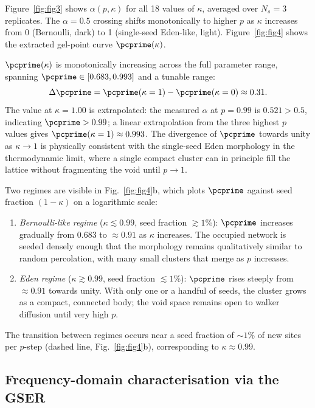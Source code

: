 Figure~\ref{fig:fig3} shows $\alpha(p, \kappa)$ for all 18 values of $\kappa$, averaged over $N_s = 3$ replicates. The $\alpha = 0.5$ crossing shifts monotonically to higher $p$ as $\kappa$ increases from 0 (Bernoulli, dark) to 1 (single-seed Eden-like, light). Figure~\ref{fig:fig4} shows the extracted gel-point curve $\pcprime(\kappa)$.

$\pcprime(\kappa)$ is monotonically increasing across the full parameter range, spanning $\pcprime \in [0.683, 0.993]$ and a tunable range:
\begin{equation}
  \Delta\pcprime = \pcprime(\kappa=1) - \pcprime(\kappa=0) \approx 0.31.
  \label{eq:range}
\end{equation}
The value at $\kappa = 1.00$ is extrapolated: the measured $\alpha$ at $p = 0.99$ is $0.521 > 0.5$, indicating $\pcprime > 0.99$; a linear extrapolation from the three highest $p$ values gives $\pcprime(\kappa=1) \approx 0.993$. The divergence of $\pcprime$ towards unity as $\kappa \to 1$ is physically consistent with the single-seed Eden morphology in the thermodynamic limit, where a single compact cluster can in principle fill the lattice without fragmenting the void until $p \to 1$.

Two regimes are visible in Fig.~\ref{fig:fig4}b, which plots $\pcprime$ against seed fraction $(1-\kappa)$ on a logarithmic scale:

\begin{enumerate}
  \item \emph{Bernoulli-like regime} ($\kappa \lesssim 0.99$, seed fraction $\gtrsim 1\%$): $\pcprime$ increases gradually from 0.683 to $\approx 0.91$ as $\kappa$ increases. The occupied network is seeded densely enough that the morphology remains qualitatively similar to random percolation, with many small clusters that merge as $p$ increases.

  \item \emph{Eden regime} ($\kappa \gtrsim 0.99$, seed fraction $\lesssim 1\%$): $\pcprime$ rises steeply from $\approx 0.91$ towards unity. With only one or a handful of seeds, the cluster grows as a compact, connected body; the void space remains open to walker diffusion until very high $p$.
\end{enumerate}

The transition between regimes occurs near a seed fraction of $\sim 1\%$ of new sites per $p$-step (dashed line, Fig.~\ref{fig:fig4}b), corresponding to $\kappa \approx 0.99$.

\subsection{Frequency-domain characterisation via the GSER}
\label{sec:results_gser}

